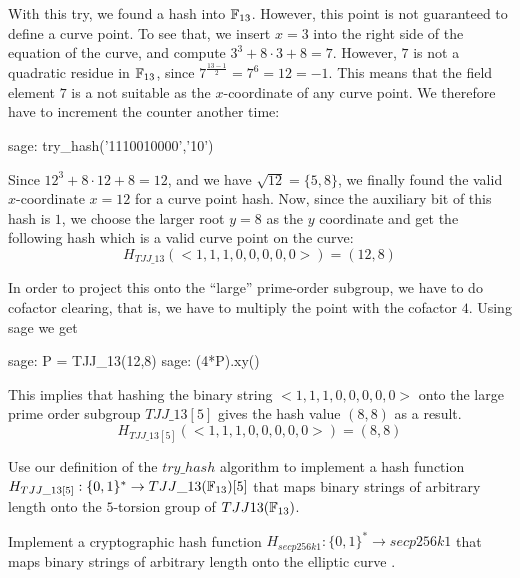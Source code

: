 \begin{example}
With this try, we found a hash into $\mathbb{F}_{13}$. However, this point is not guaranteed to define a curve point. To see that, we insert $x=3$ into the right side of the  equation of the  curve, and compute $3^3 + 8\cdot 3 + 8 = 7$. However, $7$ is not a quadratic residue in $\mathbb{F}_{13}$, since $7^{\frac{13-1}{2}}=7^6=12=-1$. This means that the field element $7$ is a not suitable as the $x$-coordinate of any curve point. We therefore have to increment the counter another time: 
\begin{sagecommandline}
sage: try_hash('1110010000','10')
\end{sagecommandline}
Since $12^3 + 8\cdot 12 + 8 = 12$, and we have $\sqrt{12} = \{5, 8\}$, we finally found the valid $x$-coordinate $x=12$ for a curve point hash. Now, since the auxiliary bit of this hash is $1$, we choose the larger root $y=8$ as the $y$ coordinate and get the following hash which is a valid curve point on the  curve:
$$
H_{TJJ\_13}(<1,1,1,0,0,0,0,0>) = (12,8)
$$

In order to project this onto the ``large'' prime-order subgroup, we have to do cofactor clearing, that is, we have to multiply the point with the cofactor $4$. Using sage we get
\begin{sagecommandline}
sage: P = TJJ_13(12,8)
sage: (4*P).xy()
\end{sagecommandline}

This implies that hashing the binary string $<1,1,1,0,0,0,0,0>$ onto the large prime order subgroup $TJJ\_13[5]$ gives the hash value $(8,8)$ as a result. 
$$
H_{TJJ\_13[5]}(<1,1,1,0,0,0,0,0>) = (8,8)
$$
\end{example}
\begin{exercise}
Use our definition of the $try\_hash$ algorithm to implement a hash function $H_{TJJ\_13[5]} : \{0,1\}^*\to TJJ\_13(\mathbb{F}_{13})[5]$ that maps binary strings of arbitrary length onto the $5$-torsion group of $TJJ13(\mathbb{F}_{13})$. 
\end{exercise}
\begin{exercise}
Implement a cryptographic hash function $H_{secp256k1} : \{0,1\}^*\to secp256k1$ that maps binary strings of arbitrary length onto the elliptic curve . 
\end{exercise}